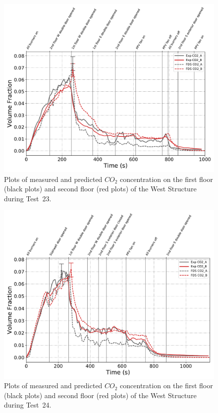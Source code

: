 \begin{figure}[!h]
	\centering
	\includegraphics[width=\columnwidth]{Figures/Plots/Validation/Gas_Concentration/Test_23_CO2}
	\caption[Plots of measured and predicted $CO_2$ concentration during Test~23.]{Plots of measured and predicted $CO_2$ concentration on the first floor (black plots) and second floor (red plots) of the West Structure during Test~23.}
	\label{fig:Test23_CO2}
\end{figure}

\begin{figure}[!h]
	\centering
	\includegraphics[width=\columnwidth]{Figures/Plots/Validation/Gas_Concentration/Test_24_CO2}
	\caption[Plots of measured and predicted $CO_2$ concentration during Test~24.]{Plots of measured and predicted $CO_2$ concentration on the first floor (black plots) and second floor (red plots) of the West Structure during Test~24.}
	\label{fig:Test24_CO2}
\end{figure}

